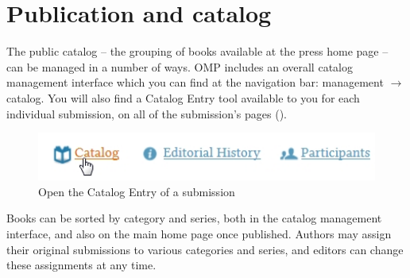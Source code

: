 

 

\section{Publication and catalog} \label{sec:catalog}

The public catalog -- the grouping of books available at the press home page -- can be managed in a number of ways. OMP includes an overall catalog management interface which you can find at the navigation bar: management $\to$ catalog. You will also find a Catalog Entry tool available to you for each individual submission, on all of the submission's pages ().

\begin{figure}[h] \centering
\includegraphics[width=1\textwidth]{./img/catalog.jpg} \caption{Open the Catalog Entry of a submission}
\label{fig:catalog}
\end{figure}

Books can be sorted by category and series, both in the catalog management interface, and also on the main home page once published. Authors may assign their original submissions to various categories and series, and editors can change these assignments at any time. 

